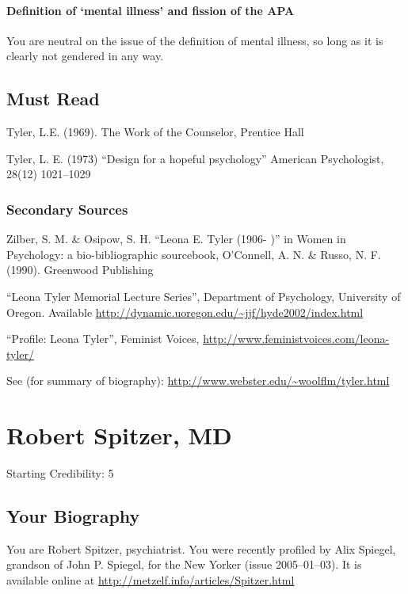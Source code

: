 \begin{refsection}
\subsubsection{Definition of ‘mental illness’ and fission of the APA}
\label{definitionof‘mentalillness’andfissionoftheapa}

You are neutral on the issue of the definition of mental illness, so long as it is clearly not gendered in any way.

\section{Must Read}
\label{mustread}

Tyler, L.E. (1969). The Work of the Counselor, Prentice Hall

Tyler, L. E. (1973) “Design for a hopeful psychology” American Psychologist, 28(12) 1021--1029

\subsection{Secondary Sources}
\label{secondarysources}

Zilber, S. M. \& Osipow, S. H. “Leona E. Tyler (1906- )” in Women in Psychology: a bio-bibliographic sourcebook, O'Connell, A. N. \& Russo, N. F. (1990). Greenwood Publishing

“Leona Tyler Memorial Lecture Series”, Department of Psychology, University of Oregon. Available \url{http://dynamic.uoregon.edu/~jjf/hyde2002/index.html}

“Profile: Leona Tyler”, Feminist Voices, \url{http://www.feministvoices.com/leona-tyler/}

See (for summary of biography): \url{http://www.webster.edu/~woolflm/tyler.html}

\chapter{Robert Spitzer, MD}
\label{robertspitzermd}

Starting Credibility: 5

\section{Your Biography}
\label{yourbiography}

You are Robert Spitzer, psychiatrist. You were recently profiled by Alix Spiegel, grandson of John P. Spiegel, for the New Yorker (issue 2005--01--03). It is available online at \url{http://metzelf.info/articles/Spitzer.html}


\end{refsection}
